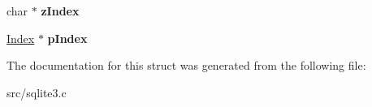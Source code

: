 \begin{DoxyCompactItemize}
\item 
\hypertarget{struct_src_list_1_1_src_list__item_a72b8e117712e49607b770a462fb42d95}{char $\ast$ {\bfseries z\-Index}}\label{struct_src_list_1_1_src_list__item_a72b8e117712e49607b770a462fb42d95}

\item 
\hypertarget{struct_src_list_1_1_src_list__item_ab4722e97bd4852c8b84e620185955c28}{\hyperlink{struct_index}{Index} $\ast$ {\bfseries p\-Index}}\label{struct_src_list_1_1_src_list__item_ab4722e97bd4852c8b84e620185955c28}

\end{DoxyCompactItemize}


The documentation for this struct was generated from the following file\-:\begin{DoxyCompactItemize}
\item 
src/sqlite3.\-c\end{DoxyCompactItemize}
